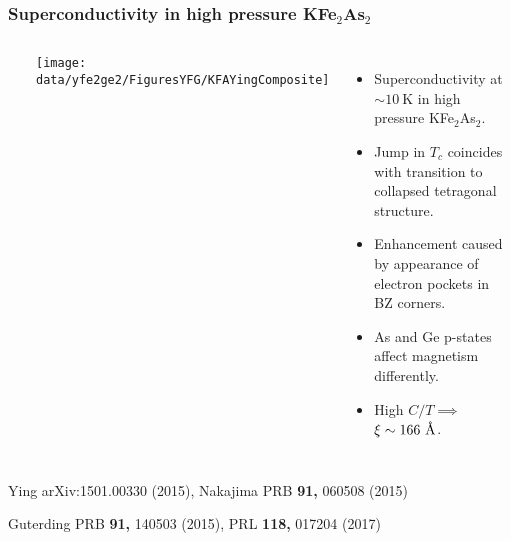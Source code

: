 \begin{frame}[label=CollapsedTetragonalSupercon]
\frametitle{Superconductivity in high pressure KFe$_2$As$_2$}

\begin{columns}[c]
\centerline{~}
\centerline{\texttt{[image: \\data/yfe2ge2/FiguresYFG/KFAYingComposite]}}

\begin{itemize} \itemsep 7pt
\item
Superconductivity at $\sim 10~ \text{K}$ in high pressure
KFe$_2$As$_2$.

\item
Jump in $T_c$ coincides with transition to collapsed tetragonal
structure.

\item
Enhancement caused by appearance of electron pockets in
BZ corners. \\

\item
As and Ge p-states affect magnetism differently. 


\item
High $C/T \implies$ $\xi \sim 166 ~\mbox{\AA}$.


\end{itemize}

\end{columns}
 

\vspace*{\fill}
\vspace{1.5em}
\centerline{\makebox[\linewidth]{\rule{0.85\textwidth}{0.4pt}}}
\centerline{\scriptsize Ying arXiv:1501.00330 (2015), Nakajima PRB
  {\bf 91,} 060508 (2015)}
\centerline{\scriptsize  Guterding PRB {\bf 91,} 140503 (2015), PRL
  {\bf 118,} 017204 (2017)}
\end{frame}





